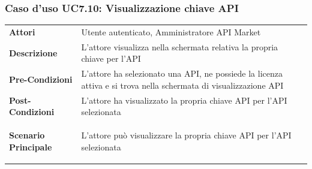 \subsubsection{Caso d'uso UC7.10: Visualizzazione chiave API}
\label{UC7_10}

\begin{minipage}{\linewidth}
	\begin{tabular}{ l | p{11cm}}
		\hline
		\rowcolor{Gray}
		\multicolumn{2}{c}{UC7.10 - Visualizzazione chiave API} \\
		\hline
		\textbf{Attori} & Utente autenticato, Amministratore API Market \\
		\textbf{Descrizione} & L'attore visualizza nella schermata relativa la propria chiave per l'API \\
		\textbf{Pre-Condizioni} & L'attore ha selezionato una API, ne possiede la licenza attiva e si trova nella schermata di visualizzazione API \\
		\textbf{Post-Condizioni} & L'attore ha visualizzato la propria chiave API per l'API selezionata \\
		\textbf{Scenario Principale} & 
		\begin{enumerate*}[label=(\arabic*.),itemjoin={\newline}]
			\item L'attore può visualizzare la propria chiave API per l'API selezionata
		\end{enumerate*}\\
	\end{tabular}
\end{minipage}